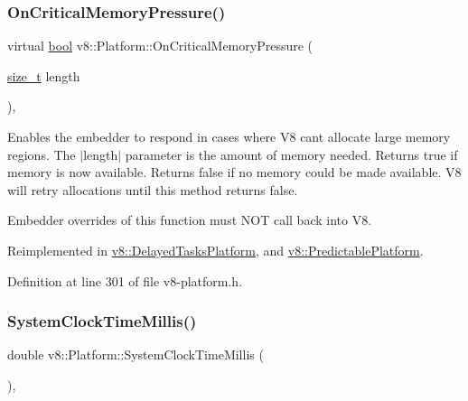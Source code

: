 \subsubsection{\texorpdfstring{On\+Critical\+Memory\+Pressure()}{OnCriticalMemoryPressure()}\hspace{0.1cm}{\footnotesize\ttfamily [2/2]}}
{\footnotesize\ttfamily virtual \mbox{\hyperlink{classbool}{bool}} v8\+::\+Platform\+::\+On\+Critical\+Memory\+Pressure (\begin{DoxyParamCaption}\item[{\mbox{\hyperlink{classsize__t}{size\+\_\+t}}}]{length }\end{DoxyParamCaption})\hspace{0.3cm}{\ttfamily [inline]}, {\ttfamily [virtual]}}

Enables the embedder to respond in cases where V8 can\textquotesingle{}t allocate large memory regions. The $\vert$length$\vert$ parameter is the amount of memory needed. Returns true if memory is now available. Returns false if no memory could be made available. V8 will retry allocations until this method returns false.

Embedder overrides of this function must N\+OT call back into V8. 

Reimplemented in \mbox{\hyperlink{classv8_1_1DelayedTasksPlatform_a0e71d1dd7f3096bccd5a118506e87597}{v8\+::\+Delayed\+Tasks\+Platform}}, and \mbox{\hyperlink{classv8_1_1PredictablePlatform_a358d24a36a74e1c9e2a9bbae6e81bff1}{v8\+::\+Predictable\+Platform}}.



Definition at line 301 of file v8-\/platform.\+h.

\mbox{\label{classv8_1_1Platform_accf17a5dcca8d35e130a0d2e9d4fa0fc}} 
\subsubsection{\texorpdfstring{System\+Clock\+Time\+Millis()}{SystemClockTimeMillis()}}
{\footnotesize\ttfamily double v8\+::\+Platform\+::\+System\+Clock\+Time\+Millis (\begin{DoxyParamCaption}{ }\end{DoxyParamCaption})\hspace{0.3cm}{\ttfamily [static]}, {\ttfamily [protected]}}

